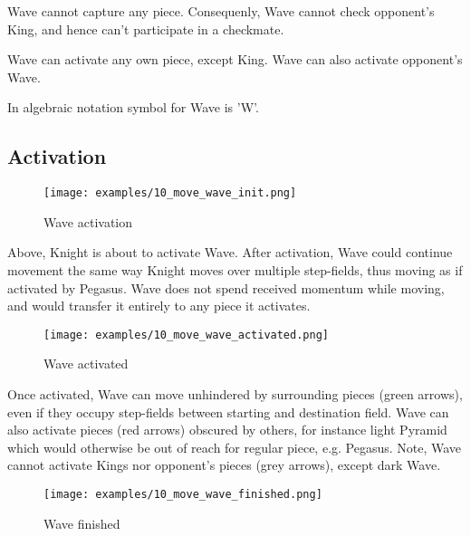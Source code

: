 Wave cannot capture any piece. Consequenly, Wave cannot check opponent's
King, and hence can't participate in a checkmate.

Wave can activate any own piece, except King. Wave can also activate
opponent's Wave.

In algebraic notation symbol for Wave is 'W'.

\clearpage %

\subsection*{Activation}

\noindent
\begin{figure}[h]
\texttt{[image: examples/10\_move\_wave\_init.png]}
\caption{Wave activation}
\label{fig:10_move_wave_init}
\end{figure}

Above, Knight is about to activate Wave. After activation, Wave could
continue movement the same way Knight moves over multiple step-fields,
thus moving as if activated by Pegasus. Wave does not spend received
momentum while moving, and would transfer it entirely to any piece it
activates.

\clearpage %

\noindent
\begin{figure}[h]
\texttt{[image: examples/10\_move\_wave\_activated.png]}
\caption{Wave activated}
\label{fig:10_move_wave_activated}
\end{figure}

Once activated, Wave can move unhindered by surrounding pieces (green arrows),
even if they occupy step-fields between starting and destination field. Wave
can also activate pieces (red arrows) obscured by others, for instance light
Pyramid which would otherwise be out of reach for regular piece, e.g. Pegasus.
Note, Wave cannot activate Kings nor opponent's pieces (grey arrows), except
dark Wave.

\clearpage %

\noindent
\begin{figure}[h]
\texttt{[image: examples/10\_move\_wave\_finished.png]}
\caption{Wave finished}
\label{fig:10_move_wave_finished}
\end{figure}

